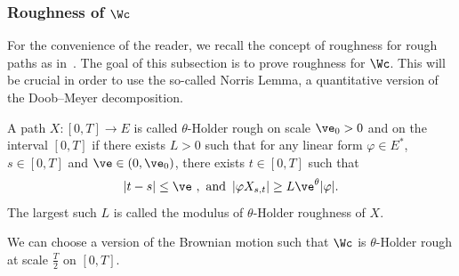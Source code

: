 \subsubsection{Roughness of \texorpdfstring{$\Wc$}{Wc}}
For the convenience of the reader, we recall the concept of roughness for rough paths as in~\cite[Definition~6.7]{FH14}. The goal of this subsection is to prove roughness for $\Wc$. This will be crucial in order to use the so-called Norris Lemma, a quantitative version of the Doob--Meyer decomposition.

\begin{defi}
A path $X:[0,T]\to E$ is called $\theta$-Holder rough on scale $\ve_0>0$ and on the interval $[0,T]$ if there exists $L>0$ such that for any linear form $\varphi \in E^*$, $s\in[0,T]$ and $\ve\in(0,\ve_0)$, there exists $t\in [0,T]$ such that
\[
|t-s|\leq \ve \ ,\text{ and } \, |\varphi X_{s,t}|\geq L\ve^\theta|\varphi|.
\]
The largest such $L$ is called the modulus of $\theta$-Holder roughness of $X$.
\end{defi}

\begin{lemm}\label{lemma:roughness}
We can choose a version of the Brownian motion such that $\Wc$ is $\theta$-Holder rough at scale $\frac{T}{2}$ on $[0,T]$.
\end{lemm}


